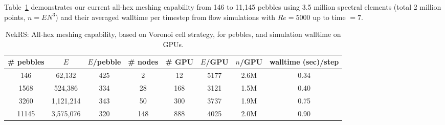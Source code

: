 Table~\ref{tab:pebble} demonstrates our current all-hex meshing capability from 146 to 11,145 pebbles 
using 3.5 million spectral elements (total 2 million points, $n = EN^3$) 
and their averaged walltime per timestep from flow simulations with
$Re= 5000$ up to time $=7$. %
\begin{table}
  \centering
  \begin{tabular}{cccccccc}
  \hline \hline
    \# pebbles & $E$ & $E$/pebble & \# nodes & \# GPU & $E$/GPU & $n$/GPU & walltime (sec)/step \\
  \hline
   146 & 62,132 & 425 & 2 & 12 & 5177 & 2.6M &  0.34    \\
   1568 & 524,386 & 334 & 28 & 168 & 3121 & 1.5M & 0.40   \\
   3260 & 1,121,214 & 343 & 50 & 300 & 3737 & 1.9M & 0.75   \\
   11145 & 3,575,076 & 320 & 148 & 888 & 4025 & 2.0M & 0.90  \\
    \hline \hline
  \end{tabular}
  \caption{NekRS: All-hex meshing capability, based on Voronoi cell strategy, for pebbles, and simulation walltime on GPUs.}
  \label{tab:pebble}
\end{table}

